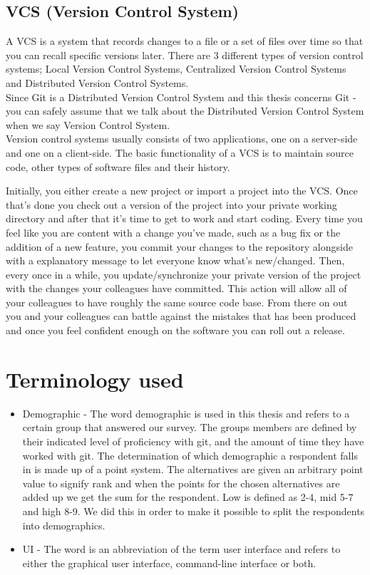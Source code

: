 \documentclass[a4paper,oneside]{bth} %
\begin{document}
			\subsection{VCS (Version Control System)}
			A VCS is a system that records changes to a file or a set of files over time so that you can recall specific versions later.
			There are 3 different types of version control systems; Local Version Control Systems, Centralized Version Control Systems and Distributed Version Control Systems.\\
			Since Git is a Distributed Version Control System and this thesis concerns Git - you can safely assume that we talk about the Distributed Version Control System when we say Version Control System.\cite{typesOfVCS}\\
			Version control systems usually consists of two applications, one on a server-side and one on a client-side.
			The basic functionality of a VCS is to maintain source code, other types of software files and their history.\cite{FoundationVCforWebDevs}
			
			Initially, you either create a new project or import a project into the VCS.
			Once that's done you check out a version of the project into your private working directory and after that it's time to get to work and start coding.
			Every time you feel like you are content with a change you've made, such as a bug fix or the addition of a new feature, you commit your changes to the repository alongside with a explanatory message to let everyone know what's new/changed.
			Then, every once in a while, you update/synchronize your private version of the project with the changes your colleagues have committed.
			This action will allow all of your colleagues to have roughly the same source code base. From there on out you and your colleagues can battle against the mistakes that has been produced  and once you feel confident enough on the software you can roll out a release.\cite{vcsExplanation}
			
			
			\section{Terminology used}
				\begin{itemize}
					\item Demographic - The word demographic is used in this thesis and refers to a certain group that answered our survey. The groups members are defined by their indicated level of proficiency with git, and the amount of time they have worked with git. The determination of which demographic a respondent falls in is made up of a point system. The alternatives are given an arbitrary point value to signify rank and when the points for the chosen alternatives are added up we get the sum for the respondent. Low is defined as 2-4, mid 5-7 and high 8-9. We did this in order to make it possible to split the respondents into demographics.
					\item UI - The word is an abbreviation of the term user interface and refers to either the graphical user interface, command-line interface or both.
				\end{itemize}
			
\end{document}
